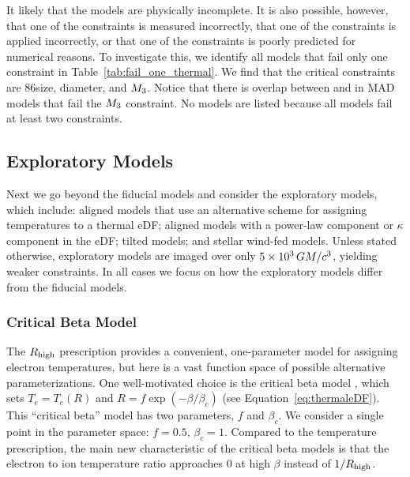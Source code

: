 It likely that the models are physically incomplete.
It is also possible, however, that one of the constraints is measured incorrectly, that one of the constraints is applied incorrectly, or that one of the constraints is poorly predicted for numerical reasons.
To investigate this, we identify all models that fail only one constraint in Table~\ref{tab:fail_one_thermal}.
We find that the critical constraints are 86\GHz size, \mring diameter, and $M_{3}$.
Notice that there is overlap between \kharma and \bhac in MAD models that fail the $M_{3}$ constraint.
No \hamr models are listed because all \hamr models fail at least two constraints.

\subsection{Exploratory Models}\label{sec:explore}

Next we go beyond the fiducial models and consider the exploratory models, which include: aligned models that use an alternative scheme for assigning temperatures to a thermal eDF; aligned models with a power-law component or $\kappa$ component in the eDF; tilted models; and stellar wind-fed models.
Unless stated otherwise, exploratory models are imaged over only $5 \times 10^3\,GM/c^3$, yielding weaker constraints.  In all cases we focus on how the exploratory models differ from the fiducial models.

\subsubsection{Critical Beta Model}

The $R_\mathrm{high}$ prescription provides a convenient, one-parameter model for assigning electron temperatures, but here is a vast function space of possible alternative parameterizations.
One well-motivated choice is the critical beta model \citep{2020MNRAS.493.1404A}, which sets $T_e = T_e(R)$ and $R = f \exp(-\beta/\beta_c)$ (see Equation~\ref{eq:thermaleDF}).
This ``critical beta'' model has two parameters, $f$ and $\beta_c$.
We consider a single point in the parameter space: $f = 0.5$, $\beta_c = 1$.
Compared to the \Rh temperature prescription, the main new characteristic of the critical beta models is that the electron to ion temperature ratio approaches 0 at high $\beta$ instead of $1/R_\mathrm{high}$.

